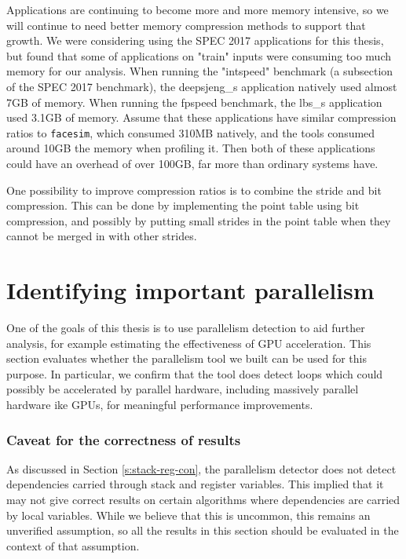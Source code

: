 \documentclass[12pt,twoside]{reedthesis}
\begin{document}
		Applications are continuing to become more and more memory intensive, so we will continue to need better memory compression methods to support that growth. We were considering using the SPEC 2017 applications for this thesis, but found that some of applications on "train" inputs were consuming too much memory for our analysis. When running the "intspeed" benchmark (a subsection of the SPEC 2017 benchmark), the deepsjeng\_s application natively used almost 7GB of memory. When running the fpspeed benchmark, the lbs\_s application used 3.1GB of memory.  
		Assume that these applications have similar compression ratios to \texttt{facesim}, which consumed 310MB natively, and the tools consumed around 10GB the memory when profiling it. Then both of these applications could have an overhead of over 100GB, far more than ordinary systems have. 

		
		One possibility to improve compression ratios is to combine the stride and bit compression. This can be done by implementing the point table using bit compression, and possibly by putting small strides in the point table when they cannot be merged in with other strides. 
		
	
	\section{Identifying important parallelism}\label{s:important-paralleism}
		
		One of the goals of this thesis is to use parallelism detection to aid further analysis, for example estimating the effectiveness of GPU acceleration. 
		This section evaluates whether the parallelism tool we built can be used for this purpose. In particular, we confirm that the tool does detect loops which could possibly be accelerated by parallel hardware, including massively parallel hardware ike GPUs, for meaningful performance improvements. 
		
		\subsubsection{Caveat for the correctness of results}
		
		As discussed in Section \ref{s:stack-reg-con}, the parallelism detector does not detect dependencies carried through stack and register variables. This implied that it may not give correct results on certain algorithms where dependencies are carried by local variables. While we believe that this is uncommon, this remains an unverified assumption, so all the results in this section should be evaluated in the context of that assumption.
		
\end{document}
